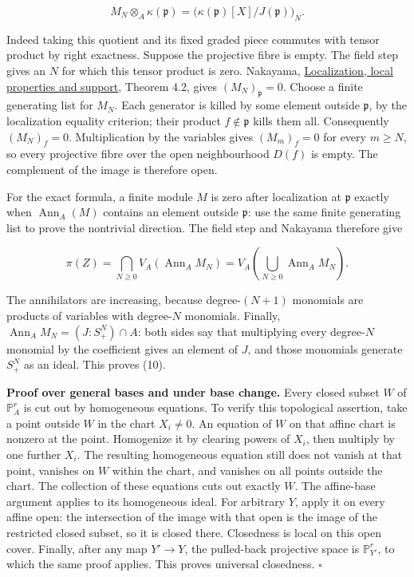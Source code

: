 \documentclass[
]{article}
\begin{document}
\[
M_N\otimes_A\kappa(\mathfrak p)
=\bigl(\kappa(\mathfrak p)[X]/J(\mathfrak p)\bigr)_N.
\]

Indeed taking this quotient and its fixed graded piece commutes with
tensor product by right exactness. Suppose the projective fibre is
empty. The field step gives an \(N\) for which this tensor product is
zero. Nakayama,
\href{../prerequisites/AG-CA/AG-CA-02.html}{Localization, local
properties and support}, Theorem 4.2, gives \((M_N)_{\mathfrak p}=0\).
Choose a finite generating list for \(M_N\). Each generator is killed by
some element outside \(\mathfrak p\), by the localization equality
criterion; their product \(f\notin\mathfrak p\) kills them all.
Consequently \((M_N)_f=0\). Multiplication by the variables gives
\((M_m)_f=0\) for every \(m\ge N\), so every projective fibre over the
open neighbourhood \(D(f)\) is empty. The complement of the image is
therefore open.

For the exact formula, a finite module \(M\) is zero after localization
at \(\mathfrak p\) exactly when \(\operatorname{Ann}_A(M)\) contains an
element outside \(\mathfrak p\): use the same finite generating list to
prove the nontrivial direction. The field step and Nakayama therefore
give

\[
\pi(Z)=\bigcap_{N\ge0}V_A(\operatorname{Ann}_A M_N)
=V_A\left(\bigcup_{N\ge0}\operatorname{Ann}_A M_N\right).
\]

The annihilators are increasing, because degree-\((N+1)\) monomials are
products of variables with degree-\(N\) monomials. Finally,
\(\operatorname{Ann}_A M_N=(J:S_+^N)\cap A\): both sides say that
multiplying every degree-\(N\) monomial by the coefficient gives an
element of \(J\), and those monomials generate \(S_+^N\) as an ideal.
This proves (10).

\textbf{Proof over general bases and under base change.} Every closed
subset \(W\) of \(\mathbb P^r_A\) is cut out by homogeneous equations.
To verify this topological assertion, take a point outside \(W\) in the
chart \(X_i\ne0\). An equation of \(W\) on that affine chart is nonzero
at the point. Homogenize it by clearing powers of \(X_i\), then multiply
by one further \(X_i\). The resulting homogeneous equation still does
not vanish at that point, vanishes on \(W\) within the chart, and
vanishes on all points outside the chart. The collection of these
equations cuts out exactly \(W\). The affine-base argument applies to
its homogeneous ideal. For arbitrary \(Y\), apply it on every affine
open: the intersection of the image with that open is the image of the
restricted closed subset, so it is closed there. Closedness is local on
this open cover. Finally, after any map \(Y'\to Y\), the pulled-back
projective space is \(\mathbb P^r_{Y'}\), to which the same proof
applies. This proves universal closedness. \(\square\)
\end{document}
